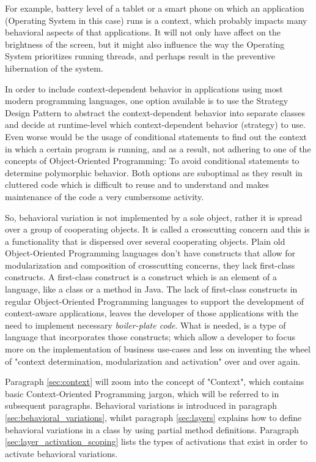 \documentclass{acm_proc_article-sp}
\begin{document}
For example, battery level of a tablet or a smart phone on which an application (Operating System in this case) runs is a context, which probably impacts many behavioral aspects of that applications. It will not only have affect on the brightness of the screen, but it might also influence the way the Operating System prioritizes running threads, and perhaps result in the preventive hibernation of the system.

In order to include context-dependent behavior in applications using most modern programming languages, one option available is to use the Strategy Design Pattern \cite{Costanza:2005:LCC:1146841.1146842,strategypattern} to abstract the context-dependent behavior into separate classes and decide at runtime-level which context-dependent behavior (strategy) to use. Even worse would be the usage of conditional statements to find out the context in which a certain program is running, and as a result, not adhering to one of the concepts of Object-Oriented Programming: To avoid conditional statements to determine polymorphic behavior. Both options are suboptimal as they result in cluttered code which is difficult to reuse and to understand and makes maintenance of the code a very cumbersome activity.

So, behavioral variation is not implemented by a sole object, rather it is spread over a group of cooperating objects. It is called a crosscutting concern \cite{kiczalesetallaop} and this is a functionality that is dispersed over several cooperating objects. Plain old Object-Oriented Programming languages don't have constructs that allow for modularization and composition of crosscutting concerns, they lack first-class constructs. A first-class construct \cite{Keays:2003:CP:940923.940926} is a construct which is an element of a language, like a class or a method in Java. The lack of first-class constructs in regular Object-Oriented Programming languages to support the development of context-aware applications, leaves the developer of those applications with the need to implement necessary \textit{boiler-plate code}. What is needed, is a type of language that incorporates those constructs; which allow a developer to focus more on the implementation of business use-cases and less on inventing the wheel of "context determination, modularization and activation" over and over again. 

Paragraph \ref{sec:context} will zoom into the concept of "Context", which contains basic Context-Oriented Programming jargon, which will be referred to in subsequent paragraphs. Behavioral variations is introduced in paragraph \ref{sec:behavioral_variations}, whilst paragraph \ref{sec:layers} explains how to define behavioral variations in a class by using partial method definitions. Paragraph \ref{sec:layer_activation_scoping} lists the types of activations that exist in order to activate behavioral variations. 
\end{document}
